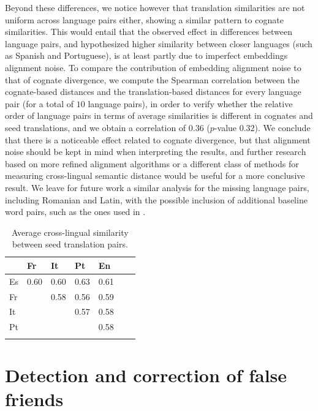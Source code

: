 \documentclass[output=paper]{langsci/langscibook}
\begin{document}
Beyond these differences, we notice however that translation similarities are not uniform across language pairs either, showing a similar pattern to cognate similarities. This would entail that the observed effect in differences between language pairs, and hypothesized higher similarity between closer languages (such as Spanish and Portuguese), is at least partly due to imperfect embeddings alignment noise. To compare the contribution of embedding alignment noise to that of cognate divergence, we compute the Spearman correlation between the cognate-based distances and the translation-based distances for every language pair (for a total of $10$ language pairs), in order to verify whether the relative order of language pairs in terms of average similarities is different in cognates and seed translations, and we obtain a correlation of $0.36$ ($p$-value $0.32$). 
We conclude that there is a noticeable effect related to cognate divergence, but that alignment noise should be kept in mind when interpreting the results, and further research based on more refined alignment algorithms or a different class of methods for measuring cross-lingual semantic distance would be useful for a more conclusive result. We leave for future work a similar analysis for the missing language pairs, including Romanian and Latin, with the possible inclusion of additional baseline word pairs, such as the ones used in \citet{cognatesuban:beinborn2019semantic}.

\begin{table}[!ht]
\begin{center}
\begin{tabular}{l l l l l l l}
\lsptoprule
& Fr & It & Pt &  En \\
\midrule

Es & 0.60 & 0.60  & 0.63 &  0.61   \\
Fr & & 0.58 & 0.56 &   0.59   \\
It & & & 0.57 &   0.58   \\
Pt & & & &   0.58   \\
\lspbottomrule

\end{tabular}
\end{center}
\caption{\label{table:seed_similarity_en}Average cross-lingual similarity between seed translation pairs.}
\end{table}

\section{Detection and correction of false friends}\largerpage
\label{section:false-friends}
\end{document}
